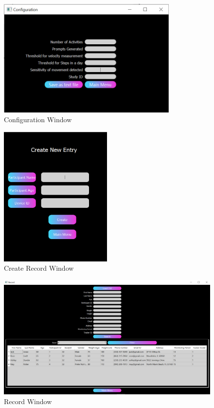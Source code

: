 \documentclass[12pt, titlepage]{article}
\begin{document}
\begin{figure}[H]
	\begin{center}
		 \includegraphics[width=0.8\textwidth]{Config}
		\caption{Configuration Window}
		\label{Config} 
	\end{center}
\end{figure}

\begin{figure}[H]
	\begin{center}
		 \includegraphics[width=0.5\textwidth]{CreateRecord}
		\caption{Create Record Window}
		\label{CreateRecord} 
	\end{center}
\end{figure}

\begin{figure}[H]
	\begin{center}
		 \includegraphics[width=1\textwidth]{Record}
		\caption{Record Window}
		\label{Record} 
	\end{center}
\end{figure}
\end{document}
